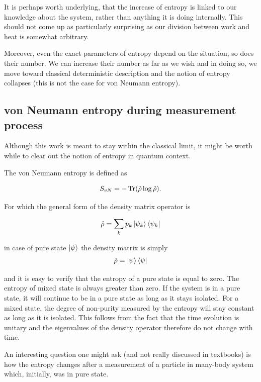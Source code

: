 \documentclass[a4paper,12pt]{article}
\begin{document}
It is perhaps worth underlying, that the increase of entropy is linked to our knowledge about the system, rather than anything it is doing internally. This should not come up as particularly surprising as our division between work and heat is somewhat arbitrary.

Moreover, even the exact parameters of entropy depend on the situation, so does their number. We can increase their number as far as we wish and in doing so, we move toward classical deterministic description and the notion of entropy collapses (this is not the case for von Neumann entropy).

\subsection{von Neumann entropy during measurement process}

Although this work is meant to stay within the classical limit, it might be worth while to clear out the notion of entropy in quantum context.

The von Neumann entropy is defined as 

\begin{equation}
  S_{vN}= -\Tr(\hat{\rho} \log{\hat{\rho}}).
\end{equation}

For which the general form of the density matrix operator is

\begin{equation}
	\hat{\rho}=\sum_k p_k \ket{\psi_k}\bra{\psi_k} 
\end{equation}

in case of pure state $\ket{\psi}$ the density matrix is simply
\begin{equation}
  \hat{\rho} = \ket{\psi}\bra{\psi}
\end{equation}

and it is easy to verify that the entropy of a pure state is equal to zero. The entropy of mixed state is always greater than zero.
If the system is in a pure state, it will continue to be in a pure state as long as it stays isolated. For a mixed state, the degree of non-purity measured by the entropy will stay constant as long as it is isolated. This follows from the fact that the time evolution is unitary and the eigenvalues of the density operator therefore do not change with time.

An interesting question one might ask (and not really discussed in textbooks) is how the entropy changes after a measurement of a particle in many-body system which, initially, was in pure state.
\end{document}
